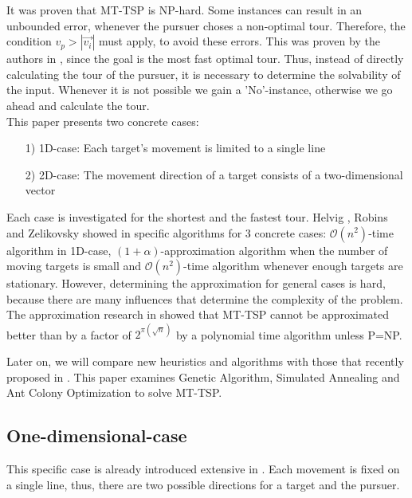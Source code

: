 \documentclass{acm_proc_article-sp}
\begin{document}
It was proven that MT-TSP is NP-hard. Some instances can result in an unbounded error, whenever the pursuer choses a non-optimal tour. Therefore, the condition $v_p > |\overrightarrow{v_i}|$ must apply, to avoid these errors. This was proven by the authors in \cite{helvig}, since the goal is the most fast optimal tour.  Thus, instead of directly calculating the tour of the pursuer, it is necessary to determine the solvability of the input. Whenever it is not possible we gain a 'No'-instance, otherwise we go ahead and calculate the tour. \\
This paper presents two concrete cases:
\begin{itemize}
\item[1)]
1D-case: 
Each target's movement is limited to a single line 

\item[2)]
2D-case:
The movement direction of a target consists of a two-dimensional vector 

\end{itemize}

Each case is investigated for the shortest and the fastest tour. Helvig , Robins and Zelikovsky showed in \cite{helvig} specific algorithms for 3 concrete cases: $\mathcal{O}(n^2)$-time algorithm in 1D-case, $(1+\alpha)$-approximation algorithm when the number of moving targets is small and $\mathcal{O}(n^2)$-time algorithm whenever enough targets are stationary. However, determining the approximation for general cases is hard, because there are many influences that determine the complexity of the problem. The approximation research in \cite{hammar} showed that MT-TSP cannot be approximated better than by a factor of $2^{\pi (\sqrt{n})}$ by a polynomial time algorithm unless P=NP.

Later on, we will compare new heuristics and algorithms with those that recently proposed in \cite{moraes}. This paper examines Genetic Algorithm, Simulated Annealing and Ant Colony Optimization to solve MT-TSP.


\subsection{One-dimensional-case}

This specific case is already introduced extensive in \cite{helvig}. Each movement is fixed on a single line, thus, there are two possible directions for a target and the pursuer. 
\end{document}
